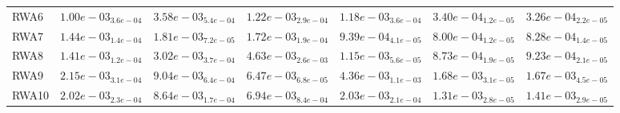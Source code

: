 \documentclass{article}
\begin{document}
\begin{table}
\begin{scriptsize}
\begin{tabular}{lllllll}
RWA6 & $  1.00e-03_{ 3.6e-04}$ & $  3.58e-03_{ 5.4e-04}$ & $  1.22e-03_{ 2.9e-04}$ & $  1.18e-03_{ 3.6e-04}$ & \cellcolor{gray25}$  3.40e-04_{ 1.2e-05}$ & \cellcolor{gray95}$  3.26e-04_{ 2.2e-05}$ \\
RWA7 & $  1.44e-03_{ 1.4e-04}$ & $  1.81e-03_{ 7.2e-05}$ & $  1.72e-03_{ 1.9e-04}$ & $  9.39e-04_{ 4.1e-05}$ & \cellcolor{gray95}$  8.00e-04_{ 1.2e-05}$ & \cellcolor{gray25}$  8.28e-04_{ 1.4e-05}$ \\
RWA8 & $  1.41e-03_{ 1.2e-04}$ & $  3.02e-03_{ 3.7e-04}$ & $  4.63e-03_{ 2.6e-03}$ & $  1.15e-03_{ 5.6e-05}$ & \cellcolor{gray95}$  8.73e-04_{ 1.9e-05}$ & \cellcolor{gray25}$  9.23e-04_{ 2.1e-05}$ \\
RWA9 & $  2.15e-03_{ 3.1e-04}$ & $  9.04e-03_{ 6.4e-04}$ & $  6.47e-03_{ 6.8e-05}$ & $  4.36e-03_{ 1.1e-03}$ & \cellcolor{gray25}$  1.68e-03_{ 3.1e-05}$ & \cellcolor{gray95}$  1.67e-03_{ 4.5e-05}$ \\
RWA10 & $  2.02e-03_{ 2.3e-04}$ & $  8.64e-03_{ 1.7e-04}$ & $  6.94e-03_{ 8.4e-04}$ & $  2.03e-03_{ 2.1e-04}$ & \cellcolor{gray95}$  1.31e-03_{ 2.8e-05}$ & \cellcolor{gray25}$  1.41e-03_{ 2.9e-05}$ \\
\hline
\end{tabular}
\end{scriptsize}
\end{table}
\end{document}
